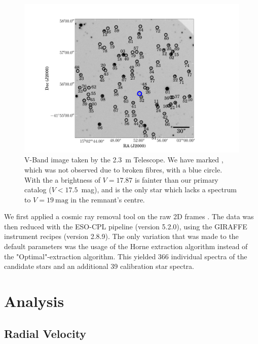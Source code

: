 \begin{figure}[tb] %
   \centering
   \includegraphics[width=\textwidth, trim=2cm 0 5cm 0, clip]{chapter_sn1006/plots/overview_labeled_sn1006.pdf} 
   \caption[Close-up of the candidates in SN 1006] {V-Band image taken by the 2.3~m Telescope. We have marked , which was not observed due to broken fibres, with a blue circle. With the a brightness of $V=17.87$  is fainter than our primary catalog ($V<17.5$~mag), and is the only star which lacks a spectrum to $V=19~\textrm{mag}$ in the remnant's centre.}
   \label{fig:sn1006:zoomed_overview}
\end{figure}


We first applied a cosmic ray removal tool on the raw 2D frames \citep{2001PASP..113.1420V}. The data was then reduced with the ESO-CPL pipeline (version 5.2.0), using the GIRAFFE instrument recipes (version 2.8.9). The only variation that was made to the default parameters was the usage of the Horne extraction algorithm instead of the "Optimal"-extraction algorithm. This yielded 366 individual spectra of the candidate stars and an additional 39 calibration star spectra. 


\section{Analysis}
\label{sec:sn1006_analysis}
\subsection{Radial Velocity}

